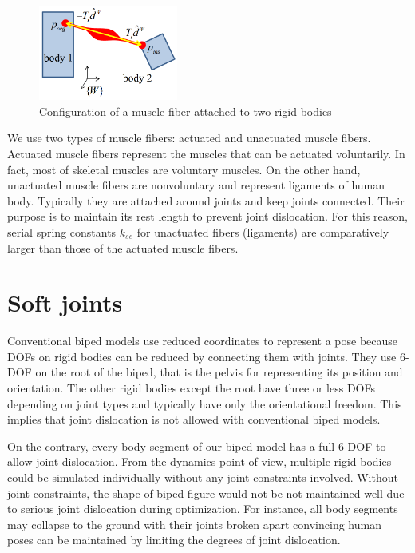 \documentclass[master,english,final]{kaist-ucs}
\begin{document}
\begin{figure}[h!]
  \centering
  \includegraphics[width=1.8in]{orgins}
  \caption{Configuration of a muscle fiber attached to two rigid bodies}
  \label{orgins}
\end{figure}

We use two types of muscle fibers: actuated and unactuated muscle fibers.
Actuated muscle fibers represent the muscles that can be actuated voluntarily.
In fact, most of skeletal muscles are voluntary muscles.
On the other hand, unactuated muscle fibers are nonvoluntary and represent
ligaments of human body.
Typically they are attached around joints and keep joints connected.
Their purpose is to maintain its rest length to prevent joint dislocation.
For this reason, serial spring constants $k_{se}$ for unactuated fibers (ligaments)
are comparatively larger than those of the actuated muscle fibers.


\section{Soft joints}

Conventional biped models use reduced coordinates to represent a pose
because DOFs on rigid bodies can be reduced by connecting them with
joints. They use 6-DOF on the root of the biped, that is the pelvis for representing its position and orientation.
The other rigid bodies except the root have three or less DOFs depending on joint types and
typically have only the orientational freedom.
This implies that joint dislocation is not allowed with
conventional biped models.

On the contrary, every body segment of our biped model has a full 6-DOF
to allow joint dislocation.
From the dynamics point of view, multiple rigid bodies could be simulated individually
without any joint constraints involved.
Without joint constraints, the shape of biped figure would not be not maintained well
due to serious joint dislocation during optimization.
For instance, all body segments may collapse to the ground with their joints broken apart
convincing human poses can be maintained by limiting the degrees of joint dislocation.
\end{document}
